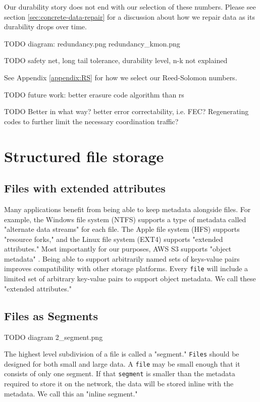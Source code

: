 \documentclass[11pt,fleqn,openany]{book}
\newcommand{\x}[1]{{\tt #1}} \newcommand{\code}[1]{{\em #1}}
\newcommand{\todo}[1]{{\color{red} TODO #1 }}
\begin{document}
Our durability story does not end with our selection of these numbers.
Please see section \ref{sec:concrete-data-repair} for a discussion about
how we repair data as its durability drops over time.

\todo{diagram:
redundancy.png
redundancy\_kmon.png
}

\todo{safety net, long tail tolerance, durability level, n-k not explained}

See Appendix \ref{appendix:RS} for how we select our Reed-Solomon numbers.

\todo{future work: better erasure code algorithm than rs}

\todo{Better in what way? better error correctability, i.e. FEC? Regenerating
codes to further limit the necessary coordination traffic?}

\section{Structured file storage}\label{sec:structured-file-storage}

\subsection{Files with extended attributes}

Many applications benefit from being able to keep metadata alongside files. For
example, the Windows file system (NTFS) supports a type of metadata called
"alternate data streams" for each file. The Apple file system (HFS) supports
"resource forks," and the Linux file system (EXT4) supports
"extended attributes." Most importantly for
our purposes, AWS S3 supports "object metadata" \cite{s3-object-meta}. Being
able to support arbitrarily named sets of keys-value pairs improves
compatibility with other storage platforms. Every \x{file} will include a
limited set of arbitrary key-value pairs to support object metadata. We call
these "extended attributes."

\subsection{Files as Segments}

\todo{diagram 2\_segment.png}

The highest level subdivision of a file is called a "segment."
\x{Files} should be designed for both small and large data.
A \x{file} may be small enough that it consists of only one segment.
If that \x{segment} is smaller than the metadata required to store it on the
network, the data will be stored inline with the metadata. We call this an
"inline segment."
\end{document}
